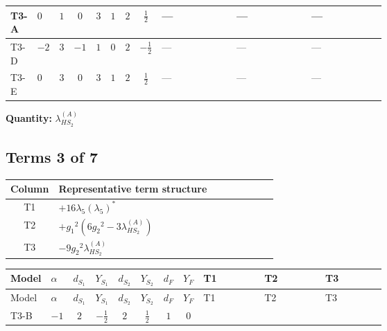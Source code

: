 \documentclass[8pt]{article}
\begin{document}
\begin{landscape}
\begin{longtable}{@{}llcccccc >{\raggedright\arraybackslash}p{0.21\linewidth} >{\raggedright\arraybackslash}p{0.21\linewidth} >{\raggedright\arraybackslash}p{0.21\linewidth}@{}}
\midrule
T3-A & $0$ & $1$ & $0$ & $3$ & $1$ & $2$ & $\frac{1}{2}$ & --- & --- & --- \\
\midrule
T3-D & $-2$ & $3$ & $-1$ & $1$ & $0$ & $2$ & $-\frac{1}{2}$ & --- & --- & --- \\
\midrule
T3-E & $0$ & $3$ & $0$ & $3$ & $1$ & $2$ & $\frac{1}{2}$ & --- & --- & --- \\
\midrule
\bottomrule
\end{longtable}
\clearpage
\noindent\textbf{Quantity: }$\lambda_{HS_2}^{(A)}$\par\smallskip
\subsection*{Terms 3 of 7}
\begin{center}
\begin{tabular}{@{}c >{\raggedright\arraybackslash}p{0.82\linewidth}@{}}
\toprule
Column & Representative term structure \\
\midrule
T1 & \(\displaystyle +16 {\lambda_5} \left({\lambda_5}\right)^{*}\) \\
\midrule
T2 & \(\displaystyle +{g_1}^2 \left(6 {g_2}^2-3 {\lambda_{HS_2}^{(A)}}\right)\) \\
\midrule
T3 & \(\displaystyle -9 {g_2}^2 {\lambda_{HS_2}^{(A)}}\) \\
\midrule
\bottomrule
\end{tabular}
\end{center}
\smallskip
\tiny
\begin{longtable}{@{}llcccccc >{\raggedright\arraybackslash}p{0.21\linewidth} >{\raggedright\arraybackslash}p{0.21\linewidth} >{\raggedright\arraybackslash}p{0.21\linewidth}@{}}
\toprule
Model & $\alpha$ & $d_{S_1}$ & $Y_{S_1}$ & $d_{S_2}$ & $Y_{S_2}$ & $d_F$ & $Y_F$ & T1 & T2 & T3 \\
\midrule
\endfirsthead
\toprule
Model & $\alpha$ & $d_{S_1}$ & $Y_{S_1}$ & $d_{S_2}$ & $Y_{S_2}$ & $d_F$ & $Y_F$ & T1 & T2 & T3 \\
\midrule
\endhead
T3-B & $-1$ & $2$ & $-\frac{1}{2}$ & $2$ & $\frac{1}{2}$ & $1$ & $0$ & \scriptsize\adjustbox{max width=\linewidth}{$\begin{gathered} +16 {\lambda_5} \left({\lambda_5}\right)^{*}\end{gathered}$} & \scriptsize\adjustbox{max width=\linewidth}{$\begin{gathered} +{g_1}^2 \left(6 {g_2}^2-3 {\lambda_{HS_2}^{(A)}}\right)\end{gathered}$} & \scriptsize\adjustbox{max width=\linewidth}{$\begin{gathered} -9 {g_2}^2 {\lambda_{HS_2}^{(A)}}\end{gathered}$} \\

\end{longtable}
\end{landscape}
\end{document}
